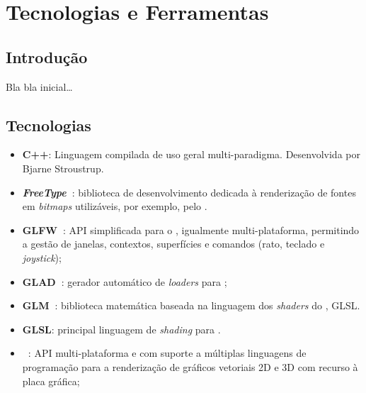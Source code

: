 \chapter{Tecnologias e Ferramentas}
\label{ch::tecno}

\section{Introdução}
\label{sec::tecno:intro}

Bla bla inicial\ldots


\section{Tecnologias}
\label{sec::tecno:tecno}

\begin{itemize}
    \item \textbf{C++}: Linguagem compilada de uso geral multi-paradigma. Desenvolvida por Bjarne Stroustrup.
    
    \item \textbf{\textit{FreeType}~\cite{freetype}}: biblioteca de desenvolvimento dedicada à renderização de fontes em \textit{bitmaps} utilizáveis, por exemplo, pelo \opengl.
    
    \item \textbf{GLFW~\cite{glfw}}: \ac{API} simplificada para o \opengl, igualmente multi-plataforma, permitindo a gestão de janelas, contextos, superfícies e comandos (rato, teclado e \textit{joystick});
    
    \item \textbf{\ac{GLAD}~\cite{glad,glad-webservice}}: gerador automático de \textit{loaders} para \opengl;
    
    \item \textbf{\ac{GLM}~\cite{glm}}: biblioteca matemática baseada na linguagem dos \textit{shaders} do \opengl, \ac{GLSL}.
    
    \item \textbf{\ac{GLSL}}: principal linguagem de \textit{shading} para \opengl.
    
    \item \textbf{\opengl~\cite{opengl}}: \ac{API} multi-plataforma e com suporte a múltiplas linguagens de programação para a renderização de gráficos vetoriais 2D e 3D com recurso à placa gráfica;
\end{itemize}

